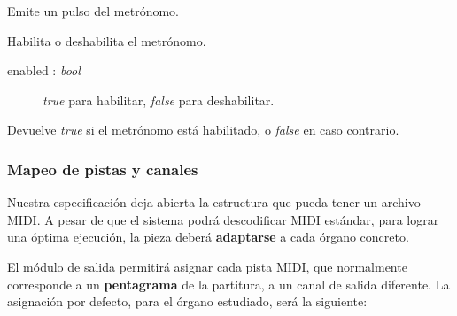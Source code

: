 \begin{description}[style=nextline]
	\item[output\_metronome ()]
	Emite un pulso del metrónomo.
	
	\item[output\_metronome\_enable (enabled)]
	Habilita o deshabilita el metrónomo.
	
	\begin{description}
		\item[enabled : \textit{bool}] \textit{true} para habilitar, \textit{false} para deshabilitar.
	\end{description}
	
	\item[output\_metronome\_enabled () : \textit{bool}]
	Devuelve \textit{true} si el metrónomo está habilitado, o \textit{false} en caso contrario.
	
\end{description}

\subsubsection{Mapeo de pistas y canales}

Nuestra especificación deja abierta la estructura que pueda tener un archivo \acrshort{MIDI}. A pesar de que el sistema podrá descodificar \acrshort{MIDI} estándar, para lograr una óptima ejecución, la pieza deberá \textbf{adaptarse} a cada órgano concreto.

El módulo de salida permitirá asignar cada pista \acrshort{MIDI}, que normalmente corresponde a un \textbf{pentagrama} de la partitura, a un canal de salida diferente. La asignación por defecto, para el órgano estudiado, será la siguiente:

\smallskip

